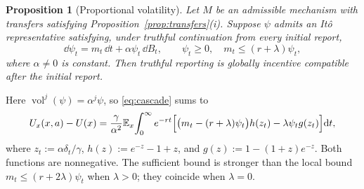 \documentclass[12pt]{article}
\newtheorem{prop}{Proposition}
\DeclareMathOperator{\vol}{vol}
\newcommand{\E}{\mathbb{E}}
\begin{document}
\begin{prop}[Proportional volatility]\label{prop:proportional-volatility}
Let \(M\) be an admissible mechanism with transfers satisfying
Proposition~\ref{prop:transfers}\textnormal{(i)}. Suppose \(\psi\)
admits an It\^o representative satisfying, under truthful continuation
from every initial report,
\[
  \dd\psi_t=m_t\,\dd t+\alpha\psi_t\,\dd B_t,
  \qquad \psi_t\geq0,\quad m_t\leq(r+\lambda)\psi_t,
\]
where \(\alpha\neq0\) is constant. Then truthful reporting is globally
incentive compatible after the initial report.
\end{prop}

Here \(\vol^j(\psi)=\alpha^j\psi\), so \eqref{eq:cascade} sums to
\[
  U_x(x,a)-U(x)
  =\frac{\gamma}{\alpha^2}\E_x\!\int_0^\infty e^{-rt}
    \Bigl[\bigl(m_t-(r+\lambda)\psi_t\bigr)h(z_t)
      -\lambda\psi_t g(z_t)\Bigr]\dd t,
\]
where \(z_t:=\alpha\delta_t/\gamma\),
\(h(z):=e^{-z}-1+z\), and \(g(z):=1-(1+z)e^{-z}\).
Both functions are nonnegative.
The sufficient bound is stronger than the local bound
\(m_t\leq(r+2\lambda)\psi_t\) when \(\lambda>0\); they coincide when
\(\lambda=0\).

\end{document}
